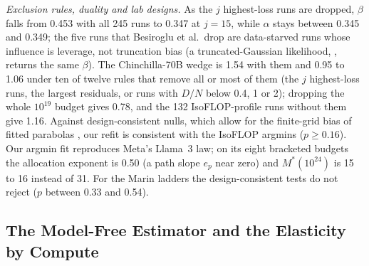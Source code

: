 \textit{Exclusion rules, duality and lab designs.} As the $j$ highest-loss runs are dropped, $\beta$ falls from 0.453
with all 245 runs to 0.347 at $j=15$, while $\alpha$ stays between 0.345 and 0.349; the five runs that Besiroglu et al.\ drop
are data-starved runs whose influence is leverage, not truncation bias (a truncated-Gaussian likelihood,
\citealp{hausman1977social}, returns the same $\beta$). The Chinchilla-70B wedge is 1.54 with them and 0.95 to 1.06 under
ten of twelve rules that remove all or most of them (the $j$ highest-loss runs, the largest residuals, or runs with $D/N$
below 0.4, 1 or 2); dropping the whole $10^{19}$ budget gives 0.78, and the 132 IsoFLOP-profile runs without them give
1.16. Against design-consistent nulls, which allow for the finite-grid bias of fitted parabolas
\citep{czech2026problems}, our refit is consistent with the IsoFLOP argmins ($p\ge0.16$). Our argmin fit reproduces Meta's
Llama~3 law; on its eight bracketed budgets the allocation exponent is 0.50 (a path slope $e_p$ near zero) and $M^*(10^{24})$ is 15
to 16 instead of 31. For the Marin
ladders the design-consistent tests do not reject ($p$ between 0.33 and 0.54).

\subsection{The Model-Free Estimator and the Elasticity by Compute}\label{app:add-modelfree}

